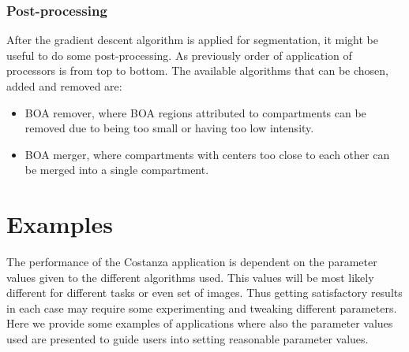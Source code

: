 \documentclass[a4paper,12pt]{article}
\begin{document}
\subsubsection{Post-processing}
After the gradient descent algorithm is applied for segmentation, it might be
useful to do some post-processing. As previously order of application of processors is from top to bottom. The available algorithms that can be chosen, added and removed are:

\begin{itemize} 
%
\item BOA remover, where BOA regions attributed to compartments can be removed due to being too small
	or having too low intensity.
%
\item BOA merger, where compartments with centers too close to each other can be
	merged into a single compartment.
%
\end{itemize}

\section{Examples}
The performance of the Costanza application is dependent on the
parameter values given to the different algorithms used. This values will be most likely different for different tasks or even set of images. Thus getting satisfactory results in each case may require some experimenting and tweaking different parameters. Here we provide
some examples of applications where also the parameter values used are
presented to guide users into setting reasonable parameter values.
\end{document}
